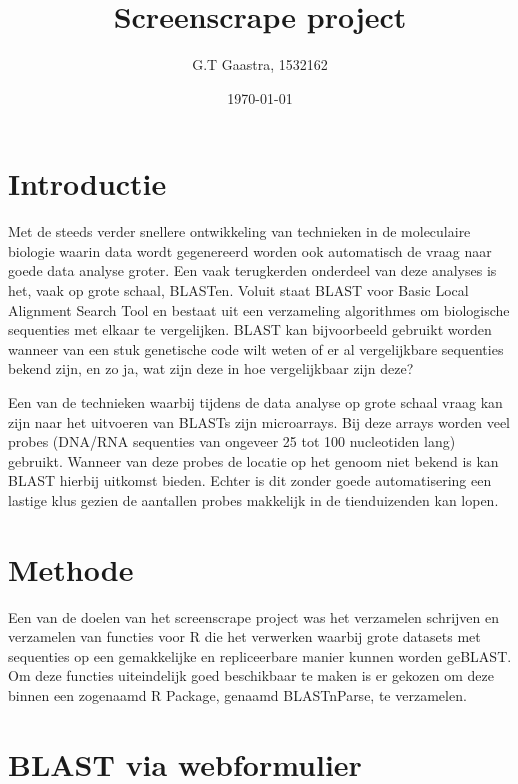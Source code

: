 \documentclass[a4paper]{article}
\title{Screenscrape project}
\author{G.T Gaastra, 1532162}
\date{\today}
\begin{document}
\maketitle


\section*{Introductie}

Met de steeds verder snellere ontwikkeling van technieken in de moleculaire biologie waarin data wordt gegenereerd worden ook automatisch de vraag naar goede data analyse groter. Een vaak terugkerden onderdeel van deze analyses is het, vaak op grote schaal, BLASTen. Voluit staat BLAST voor Basic Local Alignment Search Tool en bestaat uit een verzameling algorithmes om biologische sequenties met elkaar te vergelijken. BLAST kan bijvoorbeeld gebruikt worden wanneer van een stuk genetische code wilt weten of er al vergelijkbare sequenties bekend zijn, en zo ja, wat zijn deze in hoe vergelijkbaar zijn deze?

Een van de technieken waarbij tijdens de data analyse op grote schaal vraag kan zijn naar het uitvoeren van BLASTs zijn microarrays. Bij deze arrays worden veel probes (DNA/RNA sequenties van ongeveer 25 tot 100 nucleotiden lang) gebruikt. Wanneer van deze probes de locatie op het genoom niet bekend is kan BLAST hierbij uitkomst bieden. Echter is dit zonder goede automatisering een lastige klus gezien de aantallen probes makkelijk in de tienduizenden kan lopen. 

\section*{Methode}

Een van de doelen van het screenscrape project was het verzamelen schrijven en verzamelen van functies voor R\cite{Rcran} die het verwerken waarbij grote datasets met sequenties op een gemakkelijke en repliceerbare manier kunnen worden geBLAST.  Om deze functies uiteindelijk goed beschikbaar te maken is er gekozen om deze binnen een zogenaamd R Package, genaamd BLASTnParse, te verzamelen.

\section*{BLAST via webformulier}
\end{document}
